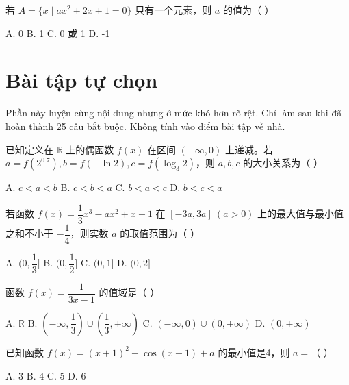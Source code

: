 \documentclass[11pt, a4paper]{article}
\begin{document}
\begin{baitap}[25]
若 $A=\{x\mid ax^2+2x+1=0\}$ 只有一个元素，则 $a$ 的值为（ ）
\par\vspace{3pt}
\noindent A. 0 \quad B. 1 \quad C. 0 或 1 \quad D. -1
\end{baitap}

\clearpage
\section{Bài tập tự chọn}

Phần này luyện cùng nội dung nhưng ở mức khó hơn rõ rệt. Chỉ làm sau khi đã hoàn thành 25 câu bắt buộc. Không tính vào điểm bài tập về nhà.

\begin{baitap}[1]
已知定义在 $\mathbb{R}$ 上的偶函数 $f(x)$ 在区间 $(-\infty, 0)$ 上递减。若 $a = f(2^{0.7}), b = f(-\ln 2), c = f(\log_3 2)$，则 $a, b, c$ 的大小关系为（ ）
\par\vspace{3pt}
\noindent A. $c < a < b$ \quad B. $c < b < a$ \quad C. $b < a < c$ \quad D. $b < c < a$
\end{baitap}

\begin{baitap}[2]
若函数 $f(x) = \dfrac{1}{3}x^3 - ax^2 + x + 1$ 在 $[-3a, 3a] \ (a > 0)$ 上的最大值与最小值之和不小于 $-\dfrac{1}{4}$，则实数 $a$ 的取值范围为（ ）
\par\vspace{3pt}
\noindent A. $(0, \dfrac{1}{3}]$ \quad B. $(0, \dfrac{1}{2}]$ \quad C. $(0, 1]$ \quad D. $(0, 2]$
\end{baitap}

\begin{baitap}[3]
函数 $f(x) = \dfrac{1}{3x-1}$ 的值域是（ ）
\par\vspace{3pt}
\noindent A. $\mathbb{R}$ \quad B. $\left(-\infty, \dfrac{1}{3}\right) \cup \left(\dfrac{1}{3}, +\infty\right)$ \quad C. $(-\infty, 0) \cup (0, +\infty)$ \quad D. $(0, +\infty)$
\end{baitap}

\begin{baitap}[4]
已知函数 $f(x) = (x+1)^2 + \cos(x+1) + a$ 的最小值是4，则 $a =$（ ）
\par\vspace{3pt}
\noindent A. 3 \quad B. 4 \quad C. 5 \quad D. 6
\end{baitap}
\end{document}

